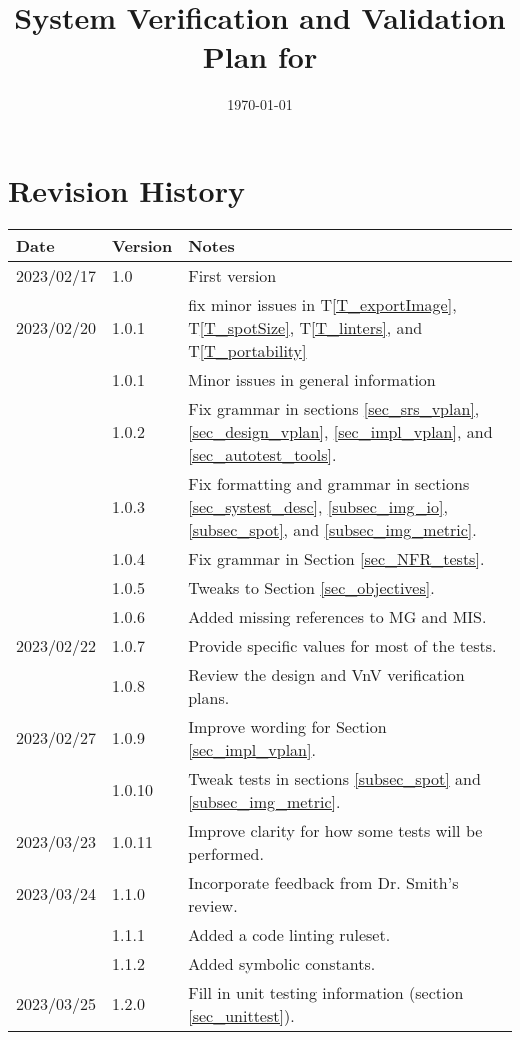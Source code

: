 \documentclass[12pt, titlepage]{article}
\begin{document}
\title{System Verification and Validation Plan for \progname{}} 
\author{\authname}
\date{\today}
	
\maketitle


\section{Revision History}

\begin{tabularx}{\textwidth}{p{2.2cm}p{1.8cm}X}
\toprule {\bf Date} & {\bf Version} & {\bf Notes}\\
\midrule
2023/02/17 & 1.0 & First version \\
2023/02/20 & 1.0.1 & fix minor issues in T\ref{T_exportImage}, T\ref{T_spotSize}, T\ref{T_linters}, 
  and T\ref{T_portability}\\
  & 1.0.1 & Minor issues in general information\\
  & 1.0.2 & Fix grammar in sections \ref{sec_srs_vplan}, 
  \ref{sec_design_vplan}, \ref{sec_impl_vplan}, and \ref{sec_autotest_tools}. \\
  & 1.0.3 & Fix formatting and grammar in sections \ref{sec_systest_desc}, 
  \ref{subsec_img_io}, \ref{subsec_spot}, and \ref{subsec_img_metric}. \\
  & 1.0.4 & Fix grammar in Section \ref{sec_NFR_tests}. \\
  & 1.0.5 & Tweaks to Section \ref{sec_objectives}. \\
  & 1.0.6 & Added missing references to MG and MIS. \\
2023/02/22 & 1.0.7 & Provide specific values for most of the tests. \\
  & 1.0.8 & Review the design and VnV verification plans. \\
2023/02/27 & 1.0.9 & Improve wording for Section \ref{sec_impl_vplan}. \\
  & 1.0.10 & Tweak tests in sections \ref{subsec_spot} and \ref{subsec_img_metric}. \\
2023/03/23 & 1.0.11 & Improve clarity for how some tests will be performed.\\
2023/03/24 & 1.1.0 & Incorporate feedback from Dr. Smith's review.\\
  & 1.1.1 & Added a code linting ruleset.\\
  & 1.1.2 & Added symbolic constants.\\
2023/03/25 & 1.2.0 & Fill in unit testing information (section \ref{sec_unittest}). \\
\bottomrule
\end{tabularx}
\end{document}
